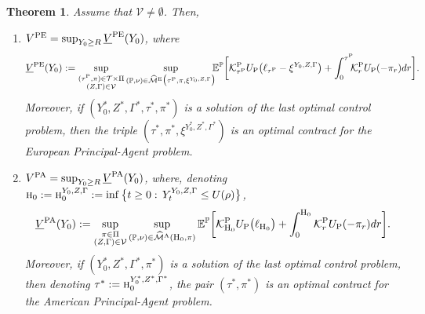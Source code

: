 \documentclass[11pt,a4paper]{article}
\numberwithin{equation}{section}
\def\dbE{\mathbb{E}}
\def\dbP{\mathbb{P}}
\newcommand{\cK}{\mathcal{K}}
\newcommand{\cM}{\mathcal{M}}
\newcommand{\cT}{\mathcal{T}}
\newcommand{\cV}{\mathcal{V}}
\def\no{\noindent}
\newtheorem{theorem}{Theorem}[section]
\theoremstyle{definition}
\begin{document}
\begin{theorem} \label{thm:main}
Assume that $\cV\neq\emptyset$. Then, 
\begin{enumerate}[{\rm (i)}]
 \item $V^{\rm PE} = \sup_{Y_0\ge R} \underline{V}^{\rm PE}(Y_0)$, where
   \begin{equation*}
     \underline{V}^{\rm PE}(Y_0) 
      := 
     \sup_{\substack{(\tau^{\scriptscriptstyle\rm P},\pi)\in\cT\times\Pi  \\  (Z,\Gamma)\in\cV}}
     \sup_{(\dbP,\nu)\in\widehat{\cM}^{\rm E}\big(\tau^{\scriptscriptstyle\rm P},\pi,\xi^{Y_0,Z,\Gamma}\big)} \!\!\!
     \dbE^{\dbP}\bigg[\cK^{\rm P}_{\tau^{\scriptscriptstyle\rm P}} U_{\rm P}\big(\ell_{\tau^{\scriptscriptstyle\rm P}}-\xi^{Y_0,Z,\Gamma}\big)
                                 +\int_0^{\tau^{\scriptscriptstyle\rm P}}\!\!\!\cK_r^{\rm P}U_{\rm P}(-\pi_r)dr\bigg].
   \end{equation*}
   Moreover, if $(Y^*_0,Z^*,\Gamma^*,\tau^*,\pi^*)$ is a solution of the last optimal control problem, then the triple $(\tau^*,\pi^*,\xi^{Y^*_0,Z^*,\Gamma^*})$ is an optimal contract for the European Principal-Agent problem.
 \item $V^{\rm PA} = \sup_{Y_0\ge R} \underline{V}^{\rm PA}(Y_0)$,
        where, denoting $\mbox{\rm\sc h}_0:=\mbox{\rm\sc h}_0^{Y_0,Z,\Gamma}:= \inf \big\{t \ge 0:\, Y^{Y_0,Z,\Gamma}_t \le U(\rho) \big\}$,
          \begin{equation*}
             \underline{V}^{\rm PA}(Y_0) 
               := 
             \sup_{\substack{\pi \in \Pi \\ (Z,\Gamma)\in\cV}} 
             \sup_{(\dbP,\nu)\in\widehat{\cM}^{\rm A}(\mbox{\rm\sc h}_0,\pi)}
                       \dbE^{\dbP}\bigg[\cK^{\rm P}_{\mbox{\rm\sc h}_0} U_{\rm P}\big(\ell_{\mbox{\rm\sc h}_0} \big)
                                 +\int_0^{\mbox{\rm\sc h}_0} \cK_r^{\rm P}U_{\rm P}(-\pi_r)dr\bigg].
          \end{equation*}
   Moreover, if $(Y^*_0,Z^*,\Gamma^*,\pi^*)$ is a solution of the last optimal control problem, then denoting $\tau^*:=\mbox{\rm\sc h}_0^{Y^*_0,Z^*,\Gamma^*}$, 
       the pair $(\tau^*,\pi^*)$ is an optimal contract for the American Principal-Agent problem.
\end{enumerate}
% 
% 

\end{theorem}
\end{document}
